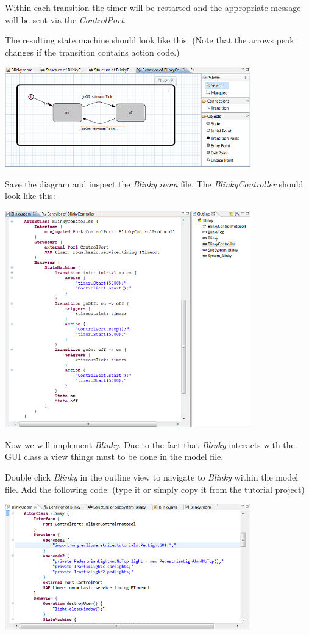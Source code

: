 Within each transition the timer will be restarted and the appropriate message will be sent via the \textit{ControlPort}. 

The resulting state machine should look like this:
(Note that the arrows peak changes if the transition contains action code.)

\includegraphics[width=0.8\textwidth]{images/020-Blinky10.png}

Save the diagram and inspect the \textit{Blinky.room} file. The \textit{BlinkyController} should look like this:

\includegraphics[width=0.8\textwidth]{images/020-Blinky11.png}
 
Now we will implement \textit{Blinky}. Due to the fact that \textit{Blinky} interacts with the GUI class a view things must to be done in the model file.

Double click \textit{Blinky} in the outline view to navigate to \textit{Blinky} within the model file.
Add the following code:
(type it or simply copy it from the tutorial project)

\includegraphics[width=0.8\textwidth]{images/020-Blinky12.png}

